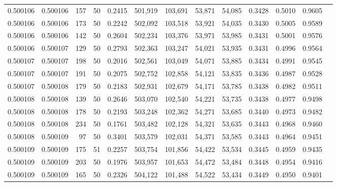 \begin{tabular}{rrrrrrrrrrrrr}
0.500106 & 0.500106 &   157 &  50 &                                     0.2415 & 501,919 & 103,691 &  53,871 &  54,085 & 0.3428 & 0.5010 & 0.9605 \\
0.500106 & 0.500106 &   173 &  50 &                                     0.2242 & 502,092 & 103,518 &  53,921 &  54,035 & 0.3430 & 0.5005 & 0.9589 \\
0.500106 & 0.500106 &   142 &  50 &                                     0.2604 & 502,234 & 103,376 &  53,971 &  53,985 & 0.3431 & 0.5001 & 0.9576 \\
0.500106 & 0.500107 &   129 &  50 &                                     0.2793 & 502,363 & 103,247 &  54,021 &  53,935 & 0.3431 & 0.4996 & 0.9564 \\
0.500107 & 0.500107 &   198 &  50 &                                     0.2016 & 502,561 & 103,049 &  54,071 &  53,885 & 0.3434 & 0.4991 & 0.9545 \\
0.500107 & 0.500107 &   191 &  50 &                                     0.2075 & 502,752 & 102,858 &  54,121 &  53,835 & 0.3436 & 0.4987 & 0.9528 \\
0.500107 & 0.500108 &   179 &  50 &                                     0.2183 & 502,931 & 102,679 &  54,171 &  53,785 & 0.3438 & 0.4982 & 0.9511 \\
0.500108 & 0.500108 &   139 &  50 &                                     0.2646 & 503,070 & 102,540 &  54,221 &  53,735 & 0.3438 & 0.4977 & 0.9498 \\
0.500108 & 0.500108 &   178 &  50 &                                     0.2193 & 503,248 & 102,362 &  54,271 &  53,685 & 0.3440 & 0.4973 & 0.9482 \\
0.500108 & 0.500108 &   234 &  50 &                                     0.1761 & 503,482 & 102,128 &  54,321 &  53,635 & 0.3443 & 0.4968 & 0.9460 \\
0.500108 & 0.500109 &    97 &  50 &                                     0.3401 & 503,579 & 102,031 &  54,371 &  53,585 & 0.3443 & 0.4964 & 0.9451 \\
0.500109 & 0.500109 &   175 &  51 &                                     0.2257 & 503,754 & 101,856 &  54,422 &  53,534 & 0.3445 & 0.4959 & 0.9435 \\
0.500109 & 0.500109 &   203 &  50 &                                     0.1976 & 503,957 & 101,653 &  54,472 &  53,484 & 0.3448 & 0.4954 & 0.9416 \\
0.500109 & 0.500109 &   165 &  50 &                                     0.2326 & 504,122 & 101,488 &  54,522 &  53,434 & 0.3449 & 0.4950 & 0.9401 \\

\end{tabular}
